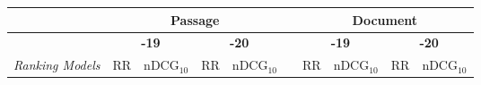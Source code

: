 \begin{table*}
    \centering
    \begin{tabular}{p{}p{}p{}p{}p{}|lp{}p{}p{}p{}}
        \toprule
            & \multicolumn{4}{c}{\textbf{\trecdl{} Passage}} && \multicolumn{4}{c}{\textbf{\trecdl{} Document}}\\
             \midrule
            & \multicolumn{2}{c}{\textbf{\trecdl{}-19}} & \multicolumn{2}{c}{\textbf{\trecdl{}-20}} && \multicolumn{2}{c}{\textbf{\trecdl{}-19}} & \multicolumn{2}{c}{\textbf{\trecdl{}-20}}\\
            \cmidrule(lr){2-3}
            \cmidrule(lr){4-5}
            \cmidrule(lr){7-8}
            \cmidrule(lr){9-10}
            \textit{Ranking Models}
            &  $\text{RR}$ & $\text{nDCG}_\text{10}$ &  $\text{RR}$ & $\text{nDCG}_\text{10}$ &&  $\text{RR}$ & $\text{nDCG}_\text{10}$ &  $\text{RR}$ & $\text{nDCG}_\text{10}$ \\
            \midrule


\end{tabular}
\end{table*}
